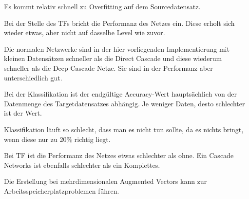 
Es kommt relativ schnell zu Overfitting auf dem Sourcedatensatz. %

Bei der Stelle des TFs bricht die Performanz des Netzes ein. Diese erholt sich wieder etwas, aber nicht auf dasselbe Level wie zuvor. 


Die normalen Netzwerke sind in der hier vorliegenden Implementierung mit kleinen Datensätzen schneller als die Direct Cascade und diese 
wiederum schneller als die Deep Cascade Netze. 
Sie sind in der Performanz aber unterschiedlich gut. \newline



Bei der Klassifikation ist der endgültige Accuracy-Wert hauptsächlich von der Datenmenge des Targetdatensatzes abhängig. 
Je weniger Daten, desto schlechter ist der Wert. %

Klassifikation läuft so schlecht, dass man es nicht tun sollte, da es nichts bringt, wenn diese nur zu 20\% richtig liegt. 

Bei TF ist die Performanz des Netzes etwas schlechter als ohne. %
Ein Cascade Networks ist ebenfalls schlechter als ein Komplettes. %


Die Erstellung bei mehrdimensionalen Augmented Vectors kann zur Arbeitsspeicherplatzproblemen führen. %

